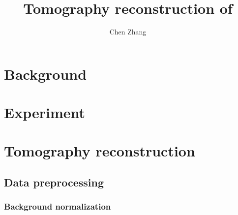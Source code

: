 \documentclass[12pt]{scrartcl}
\begin{document}
\title{Tomography reconstruction of }
\author{Chen Zhang}

\maketitle

\section{Background}\label{sec: bg}

\section{Experiment}\label{sec: exp}

\section{Tomography reconstruction}\label{sec: tomo}

\subsection{Data preprocessing}\label{sec: preprocessing}

\subsubsection{Background normalization}\label{sec: bg norm}
\end{document}
